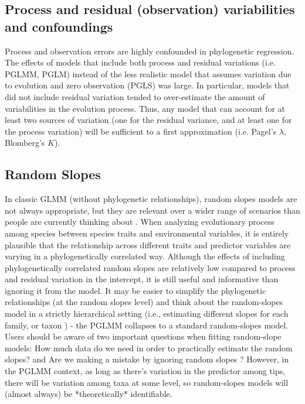 \subsection{Process and residual (observation) variabilities and confoundings}

Process and observation errors are highly confounded in phylogenetic regression.
The effects of models that include both process and residual variations (i.e. PGLMM, PGLM) instead of the less realistic model that assumes variation due to evolution and zero observation (PGLS) was large. 
In particular, models that did not include residual variation tended to over-estimate the amount of variabilities in the evolution process. 
Thus, any model that can account for at least two sources of variation (one for the residual variance, and at least one for the process variation) will be sufficient to a first approximation (i.e. Pagel's $\lambda$, Blomberg's $K$). 

\subsection{Random Slopes}

In classic GLMM (without phylogenetic relationships), random slopes models are not always appropriate, but they are relevant over a wider range of scenarios than people are currently thinking about \cite{schielzeth2008conclusions, cleasby2015quantifying}.
When analyzing evolutionary process among species between species traits and environmental variables, it is entirely plausible that the relationship across different traits and predictor variables are varying in a phylogenetically correlated way.
Although the effects of including phylogenetically correlated random slopes are relatively low compared to process and residual variation in the intercept, it is still useful and informative than ignoring it from the model.
It may be easier to simplify the phylogenetic relationships (at the random slopes level) and think about the random-slopes model in a strictly hierarchical setting (i.e., estimating different slopes for each family, or taxon \cite{bunnefeld2012island}) - the PGLMM collapses to a standard random-slopes model. 
Users should be aware of two important questions when fitting random-slope models: How much data do we need in order to practically estimate the random slopes? and Are we making a mistake by ignoring random slopes \cite{schielzeth2008conclusions}? 
However, in the PGLMM context, as long as there's variation in the predictor among tips, there will be variation among taxa at some level, so random-slopes models will (almost always) be *theoretically* identifiable.


